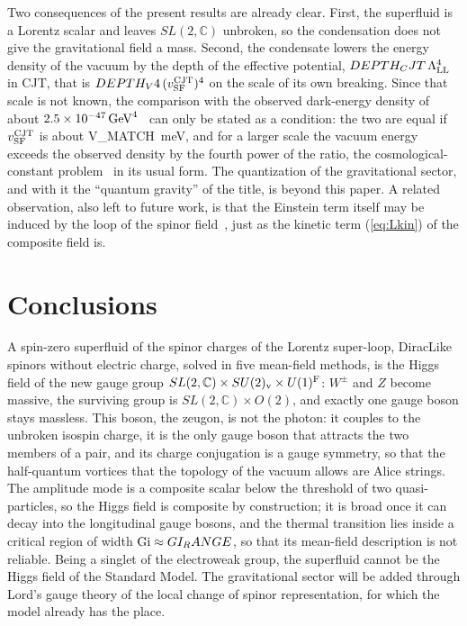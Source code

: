 \documentclass[aps,prd,twocolumn,superscriptaddress,nofootinbib,floatfix,longbibliography]{revtex4-2}
\newcommand{\LL}{{\rm LL}}
\newcommand{\SF}{{\rm SF}}
\begin{document}
Two consequences of the present results are already clear. First, the superfluid is a Lorentz scalar and leaves
$SL(2,\mathbb C)$ unbroken, so the condensation does not give the gravitational field a mass. Second, the condensate lowers
the energy density of the vacuum by the depth of the effective potential, ${{DEPTH_CJT}}\,\Lambda_\LL^4$ in CJT, that is
${{DEPTH_V4}}\,(v^{\rm CJT}_\SF)^4$ on the scale of its own breaking. Since that scale is not known, the comparison with the
observed dark-energy density of about $2.5\times10^{-47}\,{\rm GeV}^4$~\cite{PDG2024} can only be stated as a condition: the two
are equal if $v^{\rm CJT}_\SF$ is about {{V_MATCH}}~meV, and for a larger scale the vacuum energy exceeds the observed density by
the fourth power of the ratio, the cosmological-constant problem~\cite{Weinberg1989} in its usual form. The quantization of
the gravitational sector, and with it the ``quantum gravity'' of the title, is beyond this paper.
A related observation, also left to future work, is that the Einstein term itself may be induced by the loop of the spinor
field~\cite{Sakharov1967,Visser2002}, just as the kinetic term (\ref{eq:Lkin}) of the composite field is.

\section{Conclusions}
\label{sec:conclusions}

A spin-zero superfluid of the spinor charges of the Lorentz super-loop, DiracLike spinors without electric charge, solved
in five mean-field methods, is the Higgs field of the new gauge group $SL(2,\mathbb C)\times SU(2)_{\rm v}\times U(1)^{\rm F}$:
$W^\pm$ and $Z$ become massive, the surviving group is $SL(2,\mathbb C)\times O(2)$, and exactly one gauge boson stays
massless. This boson, the zeugon, is not the photon: it couples to the unbroken isospin charge, it is the only gauge boson
that attracts the two members of a pair, and its charge conjugation is a gauge symmetry, so that the half-quantum vortices
that the topology of the vacuum allows are Alice strings. The amplitude mode is a composite scalar below the threshold of two quasi-particles,
so the Higgs field is composite by construction; it is broad once it can decay into the longitudinal gauge bosons, and
the thermal transition lies inside a critical region of width ${\rm Gi}\approx{{GI_RANGE}}$, so that its mean-field
description is not reliable. Being a singlet of the electroweak group, the superfluid cannot be the Higgs field of the
Standard Model. The gravitational sector will be added through Lord's gauge theory of the local change of spinor
representation, for which the model already has the place.
\end{document}
